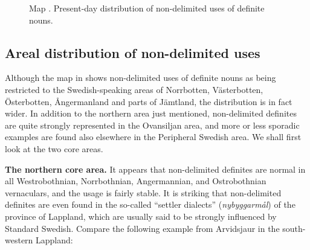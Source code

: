 \begin{stylecaption}
  [Warning: Image ignored] %
 

\end{stylecaption}

\begin{figure}[h]

\begin{minipage}{5.3055in}

\begin{stylecaption}
Map . Present-day distribution of non-delimited uses of definite nouns.

\end{stylecaption}

\end{minipage}

\end{figure}

\subsection{\rmfamily Areal distribution of non-delimited uses}

\begin{styleBodyTextFirst}
Although the map in \citet{Delsing2003a} shows non-delimited uses of definite nouns as being restricted to the Swedish-speaking areas of Norrbotten, Västerbotten, Österbotten, Ångermanland and parts of Jämtland, the distribution is in fact wider. In addition to the northern area just mentioned, non-delimited definites are quite strongly represented in the Ovansiljan area, and more or less sporadic examples are found also elsewhere in the Peripheral Swedish area. We shall first look at the two core areas.

\end{styleBodyTextFirst}

\begin{styleBodytextC}
\textbf{The northern core area. }It appears that non-delimited definites are normal in all Westrobothnian, Norrbothnian, Angermannian, and Ostrobothnian vernaculars, and the usage is fairly stable. It is striking that non-delimited definites are even found in the so-called “settler dialects” (\textit{nybyggarmål}) of the province of Lappland, which are usually said to be strongly influenced by Standard Swedish. Compare the following example from Arvidsjaur in the south-western Lappland:

\end{styleBodytextC}

